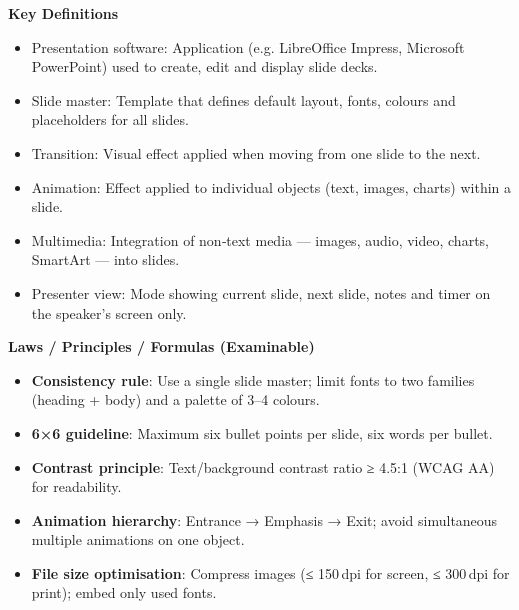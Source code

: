 \documentclass[11pt]{article}
\newcommand{\cle}[1]{{\popxbold\color{popdark}#1}}
\begin{document}
\begin{bilan}
\textbf{Key Definitions}
\begin{itemize}
  \item \cle{Presentation software}: Application (e.g. LibreOffice Impress, Microsoft PowerPoint) used to create, edit and display slide decks.
  \item \cle{Slide master}: Template that defines default layout, fonts, colours and placeholders for all slides.
  \item \cle{Transition}: Visual effect applied when moving from one slide to the next.
  \item \cle{Animation}: Effect applied to individual objects (text, images, charts) within a slide.
  \item \cle{Multimedia}: Integration of non‑text media — images, audio, video, charts, SmartArt — into slides.
  \item \cle{Presenter view}: Mode showing current slide, next slide, notes and timer on the speaker’s screen only.
\end{itemize}

\textbf{Laws / Principles / Formulas (Examinable)}
\begin{itemize}
  \item \textbf{Consistency rule}: Use a single slide master; limit fonts to two families (heading + body) and a palette of 3–4 colours.
  \item \textbf{6×6 guideline}: Maximum six bullet points per slide, six words per bullet.
  \item \textbf{Contrast principle}: Text/background contrast ratio ≥ 4.5:1 (WCAG AA) for readability.
  \item \textbf{Animation hierarchy}: Entrance → Emphasis → Exit; avoid simultaneous multiple animations on one object.
  \item \textbf{File size optimisation}: Compress images (≤ 150 dpi for screen, ≤ 300 dpi for print); embed only used fonts.
\end{itemize}


\end{bilan}
\end{document}
